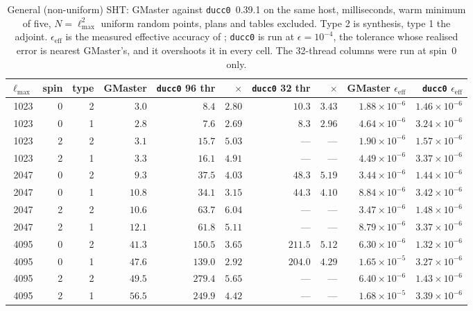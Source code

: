 \documentclass[usenatbib,useAMS]{mnras}
\begin{document}
\begin{table}
\centering
\caption{General (non-uniform) SHT: GMaster against \texttt{ducc0}~0.39.1 on the same host, milliseconds, warm minimum of five, $N=\ell_{\max}^2$ uniform random points, plans and tables excluded. Type 2 is synthesis, type 1 the adjoint. $\epsilon_{\mathrm{eff}}$ is the measured effective accuracy of \citet{belkner2024}; \texttt{ducc0} is run at $\epsilon=10^{-4}$, the tolerance whose realised error is nearest GMaster's, and it overshoots it in every cell. The 32-thread columns were run at spin~$0$ only.}
\label{tab:nusht}
\small
\begin{tabular}{@{}rrrrrrrrrr@{}}
\toprule
$\ell_{\max}$ & spin & type & GMaster & \texttt{ducc0} 96 thr & $\times$ & \texttt{ducc0} 32 thr & $\times$ & GMaster $\epsilon_{\mathrm{eff}}$ & \texttt{ducc0} $\epsilon_{\mathrm{eff}}$ \\
\midrule
1023 & 0 & 2 & $3.0$  & $8.4$   & $2.80$ & $10.3$  & $3.43$ & $1.88\times10^{-6}$ & $1.46\times10^{-6}$ \\
1023 & 0 & 1 & $2.8$  & $7.6$   & $2.69$ & $8.3$   & $2.96$ & $4.64\times10^{-6}$ & $3.24\times10^{-6}$ \\
1023 & 2 & 2 & $3.1$  & $15.7$  & $5.03$ & ---     & ---    & $1.90\times10^{-6}$ & $1.57\times10^{-6}$ \\
1023 & 2 & 1 & $3.3$  & $16.1$  & $4.91$ & ---     & ---    & $4.49\times10^{-6}$ & $3.37\times10^{-6}$ \\
2047 & 0 & 2 & $9.3$  & $37.5$  & $4.03$ & $48.3$  & $5.19$ & $3.44\times10^{-6}$ & $1.44\times10^{-6}$ \\
2047 & 0 & 1 & $10.8$ & $34.1$  & $3.15$ & $44.3$  & $4.10$ & $8.84\times10^{-6}$ & $3.42\times10^{-6}$ \\
2047 & 2 & 2 & $10.6$ & $63.7$  & $6.04$ & ---     & ---    & $3.47\times10^{-6}$ & $1.48\times10^{-6}$ \\
2047 & 2 & 1 & $12.1$ & $61.8$  & $5.11$ & ---     & ---    & $8.79\times10^{-6}$ & $3.37\times10^{-6}$ \\
4095 & 0 & 2 & $41.3$ & $150.5$ & $3.65$ & $211.5$ & $5.12$ & $6.30\times10^{-6}$ & $1.32\times10^{-6}$ \\
4095 & 0 & 1 & $47.6$ & $139.0$ & $2.92$ & $204.0$ & $4.29$ & $1.65\times10^{-5}$ & $3.27\times10^{-6}$ \\
4095 & 2 & 2 & $49.5$ & $279.4$ & $5.65$ & ---     & ---    & $6.40\times10^{-6}$ & $1.43\times10^{-6}$ \\
4095 & 2 & 1 & $56.5$ & $249.9$ & $4.42$ & ---     & ---    & $1.68\times10^{-5}$ & $3.39\times10^{-6}$ \\
\bottomrule
\end{tabular}
\end{table}
\end{document}
